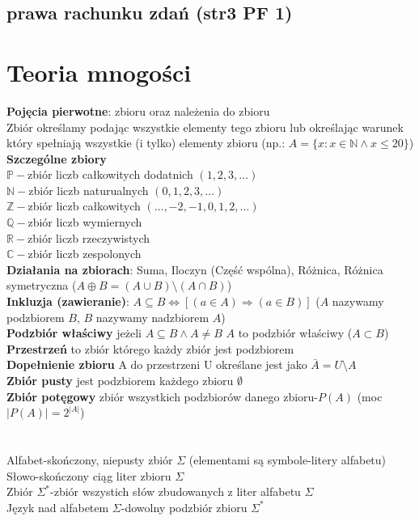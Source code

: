 \documentclass[a4paper,12pt]{article}
\begin{document}
\subsection{prawa rachunku zdań (str3 PF 1)}

\section{Teoria mnogości}
\textbf{Pojęcia pierwotne}: zbioru oraz należenia do zbioru\\
Zbiór określamy podając wszystkie elementy tego zbioru lub określając warunek który spełniają wszystkie (i tylko) elementy zbioru (np.: $A=\{x: x \in \mathbb{N} \land x \leq 20 \}$)\\
\textbf{Szczególne zbiory}\\
$\mathbb{P}-$zbiór liczb całkowitych dodatnich $(1, 2, 3,\dots)$ \\
$\mathbb{N}-$zbiór liczb naturualnych $(0, 1, 2, 3,\dots)$ \\
$\mathbb{Z}-$zbiór liczb całkowitych $(\dots, -2, -1, 0, 1, 2,\dots)$ \\
$\mathbb{Q}-$zbiór liczb wymiernych \\
$\mathbb{R}-$zbiór liczb rzeczywistych \\
$\mathbb{C}-$zbiór liczb zespolonych \\
\textbf{Działania na zbiorach}: Suma, Iloczyn (Część wspólna), Różnica, Różnica symetryczna ($A \oplus B=(A\cup B)\setminus (A \cap B)$)\\
\textbf{Inkluzja (zawieranie)}: $A\subseteq B \Leftrightarrow [(a \in A)\Rightarrow (a\in B)]$ ($A$ nazywamy podzbiorem $B$, $B$ nazywamy nadzbiorem $A$) \\
\textbf{Podzbiór właściwy} jeżeli $A\subseteq B \wedge A\neq B$ $A$ to podzbiór właściwy ($A\subset B$)\\
\textbf{Przestrzeń} to zbiór którego każdy zbiór jest podzbiorem \\
\textbf{Dopełnienie zbioru} A do przestrzeni U określane jest jako $\bar A=U \setminus A$ \\
\textbf{Zbiór pusty} jest podzbiorem każdego zbioru $\emptyset$ \\
\textbf{Zbiór potęgowy} zbiór wszystkich podzbiorów danego zbioru-$P(A)$ (moc $|P(A)|=2^{|A|}$)\\
\\
\\
Alfabet-skończony, niepusty zbiór $\Sigma$ (elementami są symbole-litery alfabetu) \\
Słowo-skończony ciąg liter zbioru $\Sigma$ \\
Zbiór $\Sigma ^*$-zbiór wszystich słów zbudowanych z liter alfabetu $\Sigma$ \\
Język nad alfabetem $\Sigma$-dowolny podzbiór zbioru $\Sigma ^*$ 
\end{document}
